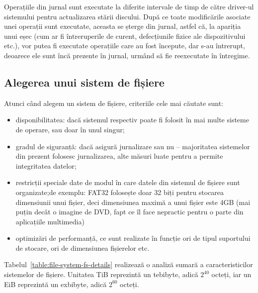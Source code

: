 Operațiile din jurnal sunt executate la diferite intervale de timp de către
driver-ul sistemului pentru actualizarea stării discului. După ce toate
modificările asociate unei operații sunt executate, aceasta se șterge din
jurnal, astfel că, la apariția unui eșec (cum ar fi întreruperile de curent,
defecțiunile fizice ale dispozitivului etc.), vor putea fi executate operațiile
care au fost începute, dar s-au întrerupt, deoarece ele sunt încă prezente în
jurnal, urmând să fie reexecutate în întregime.

\subsection{Alegerea unui sistem de fișiere}
\label{sec:file-system-fs-integrity}

Atunci când alegem un sistem de fișiere, criteriile cele mai căutate sunt:

\begin{itemize}
	\item disponibilitatea: dacă sistemul respectiv poate fi folosit în mai
		multe sisteme de operare, sau doar în unul singur;
	\item gradul de siguranță: dacă asigură jurnalizare sau nu -- majoritatea
		sistemelor din prezent folosesc jurnalizarea, alte măsuri luate
		pentru a permite integritatea datelor;
	\item restricții speciale date de modul în care datele din sistemul de
		fișiere sunt organizate;de exemplu: FAT32 folosește doar 32 biți
		pentru stocarea dimensiunii unui fișier, deci dimensiunea maximă
		a unui fișier este 4GB (mai puțin decât o imagine de DVD, fapt
		ce îl face nepractic pentru o parte din aplicațiile multimedia)
	\item optimizări de performanță, ce sunt realizate în funcție ori de
		tipul suportului de stocare, ori de dimensiunea fișierelor etc.
\end{itemize}

Tabelul~\ref{table:file-system-fs-details} realizează o analiză sumară a caracteristicilor sistemelor de
fișiere. Unitatea TiB reprezintă un tebibyte, adică $2^{40}$ octeți, iar un EiB
reprezintă un exbibyte, adică $2^{60}$ octeți.

